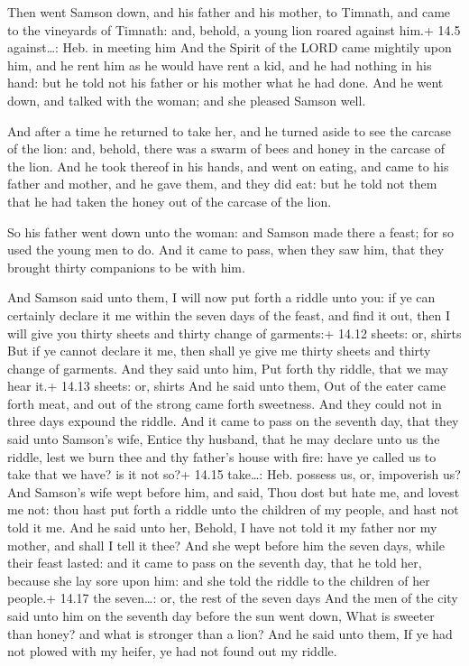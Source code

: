  Then went Samson down, and his father and his mother, to
Timnath, and came to the vineyards of Timnath: and, behold, a young lion
roared against him.+ 14.5 against\ldots: Heb. in meeting him
 And the Spirit of the LORD came mightily upon him, and he
rent him as he would have rent a kid, and he had nothing in his hand:
but he told not his father or his mother what he had done. 
And he went down, and talked with the woman; and she pleased Samson
well.

 And after a time he returned to take her, and he turned
aside to see the carcase of the lion: and, behold, there was a swarm of
bees and honey in the carcase of the lion.  And he took
thereof in his hands, and went on eating, and came to his father and
mother, and he gave them, and they did eat: but he told not them that he
had taken the honey out of the carcase of the lion.

 So his father went down unto the woman: and Samson made
there a feast; for so used the young men to do.  And it
came to pass, when they saw him, that they brought thirty companions to
be with him.

 And Samson said unto them, I will now put forth a riddle
unto you: if ye can certainly declare it me within the seven days of the
feast, and find it out, then I will give you thirty sheets and thirty
change of garments:+ 14.12 sheets: or, shirts  But if ye
cannot declare it me, then shall ye give me thirty sheets and thirty
change of garments. And they said unto him, Put forth thy riddle, that
we may hear it.+ 14.13 sheets: or, shirts  And he said unto
them, Out of the eater came forth meat, and out of the strong came forth
sweetness. And they could not in three days expound the riddle.
 And it came to pass on the seventh day, that they said
unto Samson's wife, Entice thy husband, that he may declare unto us the
riddle, lest we burn thee and thy father's house with fire: have ye
called us to take that we have? is it not so?+ 14.15 take\ldots: Heb.
possess us, or, impoverish us?  And Samson's wife wept
before him, and said, Thou dost but hate me, and lovest me not: thou
hast put forth a riddle unto the children of my people, and hast not
told it me. And he said unto her, Behold, I have not told it my father
nor my mother, and shall I tell it thee?  And she wept
before him the seven days, while their feast lasted: and it came to pass
on the seventh day, that he told her, because she lay sore upon him: and
she told the riddle to the children of her people.+ 14.17 the
seven\ldots: or, the rest of the seven days  And the men of
the city said unto him on the seventh day before the sun went down, What
is sweeter than honey? and what is stronger than a lion? And he said
unto them, If ye had not plowed with my heifer, ye had not found out my
riddle.


